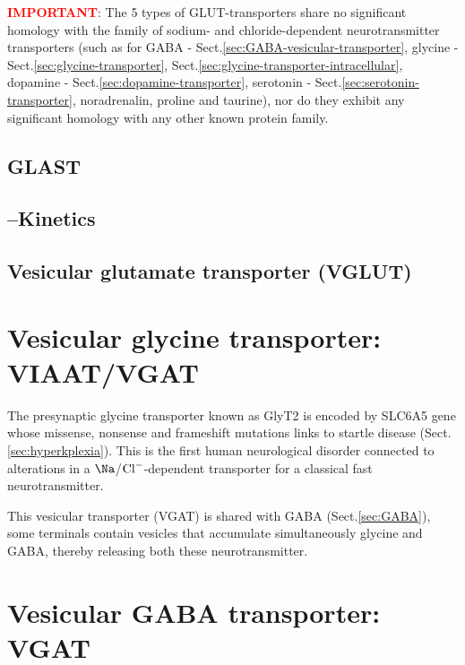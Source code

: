 \textcolor{red}{\bf IMPORTANT}: The 5 types of GLUT-transporters share no
significant homology with the family of sodium- and chloride-dependent
neurotransmitter transporters (such as for GABA -
Sect.\ref{sec:GABA-vesicular-transporter}, glycine -
Sect.\ref{sec:glycine-transporter},
Sect.\ref{sec:glycine-transporter-intracellular}, dopamine -
Sect.\ref{sec:dopamine-transporter}, serotonin -
Sect.\ref{sec:serotonin-transporter}, noradrenalin, proline and taurine), nor do
they exhibit any significant homology with any other known protein family.

\subsection{GLAST}
\label{sec:GLAST}

\subsection{--Kinetics}


\subsection{Vesicular glutamate transporter (VGLUT)}
\label{sec:VGLUT}



\section{Vesicular glycine transporter: VIAAT/VGAT}
\label{sec:VIAAT/VGAT}
\label{sec:glycine-transporter-intracellular}

The presynaptic glycine transporter known as GlyT2 is encoded by SLC6A5 gene
whose  missense, nonsense and frameshift mutations links to startle disease
(Sect.\ref{sec:hyperkplexia}).
This is the first human neurological disorder connected to alterations in a
$\Na$/${\text{Cl}^{-}}$-dependent transporter for a classical fast neurotransmitter.

This vesicular transporter (VGAT) is shared with GABA (Sect.\ref{sec:GABA}),
some terminals contain vesicles that accumulate simultaneously glycine and GABA,
thereby releasing both these neurotransmitter.

\section{Vesicular GABA transporter: VGAT}
\label{sec:VGAT}
\label{sec:GABA-vesicular-transporter}


